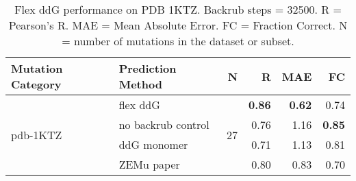 \begin{table}
  \begin{tabular}{llrrrr}
\toprule
Mutation Category &   Prediction Method &   N &    R &  MAE &   FC \\
\midrule
 \multirow{ 4}{*}{pdb-1KTZ} & flex ddG & \multirow{ 4}{*}{27} & \textbf{0.86} & \textbf{0.62} & 0.74  \\
 & no backrub control & & 0.76 & 1.16 & \textbf{0.85}  \\
 & ddG monomer & & 0.71 & 1.13 & 0.81  \\
 & ZEMu paper & & 0.80 & 0.83 & 0.70  \\
\bottomrule
\end{tabular}
  \caption[Flex ddG performance on PDB 1KTZ]{
    Flex ddG performance on PDB 1KTZ. Backrub steps = 32500. R = Pearson's R. MAE = Mean Absolute Error. FC = Fraction Correct. N = number of mutations in the dataset or subset.
  } \label{tab:table-pdb-1KTZ}
\end{table}
